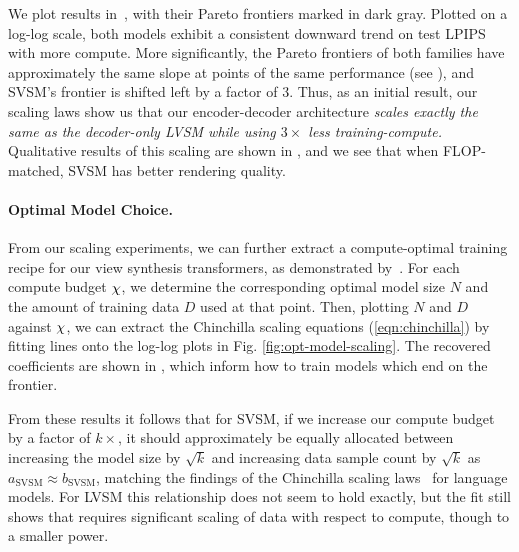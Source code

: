We plot results in~, with their Pareto frontiers marked in dark gray. Plotted on a log-log scale, both models exhibit a consistent downward trend on test LPIPS with more compute. More significantly, the Pareto frontiers of both families have approximately the same slope at points of the same performance (see ), and SVSM's frontier is shifted left by a factor of $3$. Thus, as an initial result, our scaling laws show us that our encoder-decoder architecture \textit{scales exactly the same as the decoder-only LVSM while using $3\times$ less training-compute.} Qualitative results of this scaling are shown in , and we see that when FLOP-matched, SVSM has better rendering quality.

\vspace{-1\baselineskip}





\paragraph{Optimal Model Choice.}



From our scaling experiments, we can further extract a compute-optimal training recipe for our view synthesis transformers, as demonstrated by~\citet{hoffmann2022training}. For each compute budget $\chi{}$, we determine the corresponding optimal model size $N$ and the amount of training data $D$ used at that point. Then, plotting $N$ and $D$ against $\chi{}$, we can extract the Chinchilla scaling equations (\eqref{eqn:chinchilla}) by fitting lines onto the log-log plots in Fig. \ref{fig:opt-model-scaling}. The recovered coefficients are shown in , which inform how to train models which end on the frontier.

From these results it follows that for SVSM, if we increase our compute budget by a factor of $k\times$, it should approximately be equally allocated between increasing the model size by $\sqrt k$ and increasing data sample count by $\sqrt k$ as $a_{\text{SVSM}} \approx b_{\text{SVSM}}$, matching the findings of the Chinchilla scaling laws~\citep{hoffmann2022training} for language models. For LVSM this relationship does not seem to hold exactly, but the fit still shows that requires significant scaling of data with respect to compute, though to a smaller power. 

